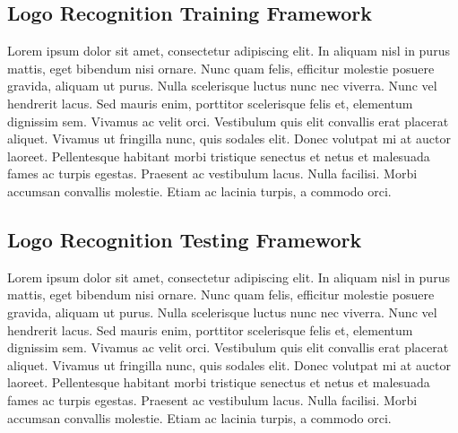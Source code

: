 \vspace{-0.3cm}


\subsection{Logo Recognition Training Framework}\label{sec:4.2.2}
\vspace{-0.5cm}
\noindent  Lorem ipsum dolor sit amet, consectetur adipiscing elit. In aliquam nisl in purus mattis, eget bibendum nisi ornare. Nunc quam felis, efficitur molestie posuere gravida, aliquam ut purus. Nulla scelerisque luctus nunc nec viverra. Nunc vel hendrerit lacus. Sed mauris enim, porttitor scelerisque felis et, elementum dignissim sem. Vivamus ac velit orci. Vestibulum quis elit convallis erat placerat aliquet. Vivamus ut fringilla nunc, quis sodales elit. Donec volutpat mi at auctor laoreet. Pellentesque habitant morbi tristique senectus et netus et malesuada fames ac turpis egestas. Praesent ac vestibulum lacus. Nulla facilisi. Morbi accumsan convallis molestie. Etiam ac lacinia turpis, a commodo orci.


\vspace{-0.3cm}


\subsection{Logo Recognition Testing Framework}\label{sec:4.2.3}
\vspace{-0.5cm}
\noindent  Lorem ipsum dolor sit amet, consectetur adipiscing elit. In aliquam nisl in purus mattis, eget bibendum nisi ornare. Nunc quam felis, efficitur molestie posuere gravida, aliquam ut purus. Nulla scelerisque luctus nunc nec viverra. Nunc vel hendrerit lacus. Sed mauris enim, porttitor scelerisque felis et, elementum dignissim sem. Vivamus ac velit orci. Vestibulum quis elit convallis erat placerat aliquet. Vivamus ut fringilla nunc, quis sodales elit. Donec volutpat mi at auctor laoreet. Pellentesque habitant morbi tristique senectus et netus et malesuada fames ac turpis egestas. Praesent ac vestibulum lacus. Nulla facilisi. Morbi accumsan convallis molestie. Etiam ac lacinia turpis, a commodo orci.


\vspace{-0.3cm}




